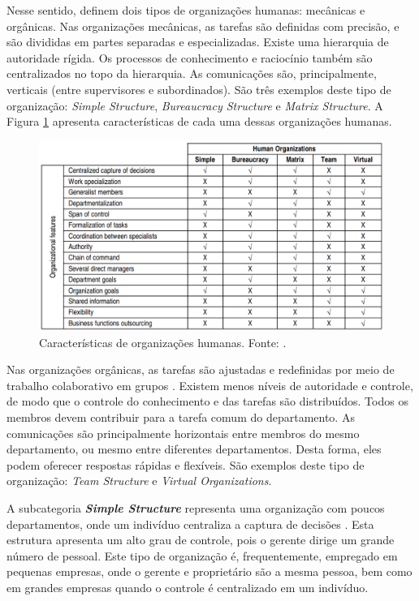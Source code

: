Nesse sentido,  definem dois tipos de organizações humanas: mecânicas e orgânicas. Nas organizações mecânicas, as tarefas são definidas com precisão, e são divididas em partes separadas e especializadas. Existe uma hierarquia de autoridade rígida. Os processos de conhecimento e raciocínio também são centralizados no topo da hierarquia. As comunicações são, principalmente, verticais (entre supervisores e subordinados). São três exemplos deste tipo de organização: \textit{Simple Structure}, \textit{Bureaucracy Structure} e \textit{Matrix Structure}. A Figura \ref{fig:organizational_feature} apresenta características de cada uma dessas organizações humanas.


\begin{figure}[H]
    \includegraphics[scale=0.35]{figuras/organizational_features.png}
    \centering
    \caption{Características de organizações humanas. Fonte: .}
    \label{fig:organizational_feature}
\end{figure}

Nas organizações orgânicas, as tarefas são ajustadas e redefinidas por meio de trabalho colaborativo em grupos \cite{Argente200655}. Existem menos níveis de autoridade e controle, de modo que o controle do conhecimento e das tarefas são distribuídos. Todos os membros devem contribuir para a tarefa comum do departamento. As comunicações são principalmente horizontais entre membros do mesmo departamento, ou mesmo entre diferentes departamentos. Desta forma, eles podem oferecer respostas rápidas e flexíveis. São exemplos deste tipo de organização: \textit{Team Structure} e \textit{Virtual Organizations}.

A subcategoria \textbf{\textit{Simple Structure}} representa uma organização com poucos departamentos, onde um indivíduo centraliza a captura de decisões \cite{Argente200655}. Esta estrutura apresenta um alto grau de controle, pois o gerente dirige um grande número de pessoal. Este tipo de organização é, frequentemente, empregado em pequenas empresas, onde o gerente e proprietário são a mesma pessoa, bem como em grandes empresas quando o controle é centralizado em um indivíduo. 

